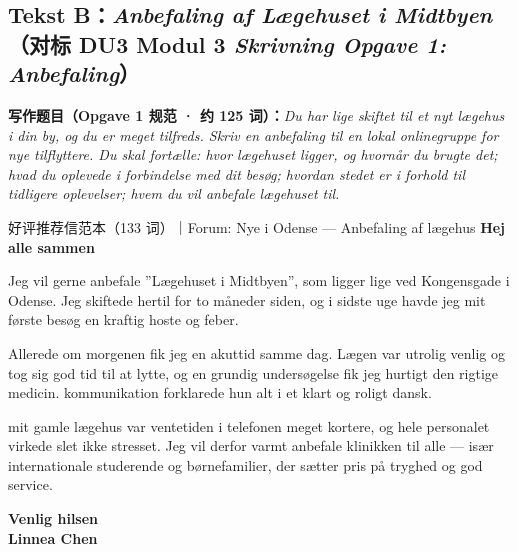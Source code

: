 \subsection*{Tekst B：\textit{Anbefaling af Lægehuset i Midtbyen}（对标 DU3 Modul 3 \textit{Skrivning Opgave 1: Anbefaling}）}

\textbf{写作题目（Opgave 1 规范 · 约 125 词）：}\textit{Du har lige skiftet til et nyt lægehus i din by, og du er meget tilfreds. Skriv en anbefaling til en lokal onlinegruppe for nye tilflyttere. Du skal fortælle:  hvor lægehuset ligger, og hvornår du brugte det;  hvad du oplevede i forbindelse med dit besøg;  hvordan stedet er i forhold til tidligere oplevelser;  hvem du vil anbefale lægehuset til.}

\begin{emailbox}{好评推荐信范本（133 词）｜Forum: Nye i Odense --- Anbefaling af lægehus}
\textbf{Hej alle sammen}

Jeg vil gerne anbefale ”Lægehuset i Midtbyen”, som ligger lige ved Kongensgade i Odense. Jeg skiftede hertil for to måneder siden, og i sidste uge havde jeg mit første besøg  en kraftig hoste og feber.

Allerede om morgenen fik jeg en akuttid samme dag. Lægen var utrolig venlig og tog sig god tid til at lytte, og  en grundig undersøgelse fik jeg hurtigt den rigtige medicin.  kommunikation forklarede hun alt i et klart og roligt dansk.

 mit gamle lægehus var ventetiden i telefonen meget kortere, og hele personalet virkede slet ikke stresset. Jeg vil derfor varmt anbefale klinikken til alle --- især internationale studerende og børnefamilier, der sætter pris på tryghed og god service.

\textbf{Venlig hilsen}\\
\textbf{Linnea Chen}
\end{emailbox}

